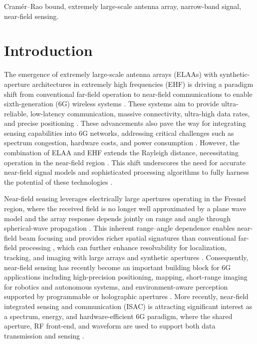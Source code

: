 \documentclass[9pt,final,journal,twocolumn]{IEEEtran}
\begin{document}
\begin{IEEEkeywords}
Cramér–Rao bound, extremely large-scale antenna array,  narrow-band signal, near-field sensing. 
\end{IEEEkeywords}

\IEEEpeerreviewmaketitle

\section{Introduction}
The emergence of extremely large-scale antenna arrays (ELAAs) with synthetic-aperture architectures in extremely high frequencies (EHF) is driving a paradigm shift from conventional far-field operation to near-field communications to enable sixth-generation (6G) wireless systems \cite{elbir2024terahertz,elbir2024curse,hodge2020intelligent}. 
These systems aim to provide ultra-reliable, low-latency communication, massive connectivity, ultra-high data rates, and precise positioning \cite{wachowiak2026sizing,wang2023on}. These advancements also pave the way for integrating sensing capabilities into 6G networks, addressing critical challenges such as spectrum congestion, hardware costs, and power consumption \cite{mishra2024signal,mishra2019toward,wei2024RIS,vargas2023dual}. However, the combination of ELAA and EHF extends the Rayleigh distance, necessitating operation in the near-field region \cite{balanis2011modern,zohair2021near,bevilacqua2025reflectivity,rajwan2025near,jiang2024near}. This shift underscores the need for accurate near-field signal models and sophisticated processing algorithms to fully harness the potential of these technologies \cite{elbir2025near}.
 
Near-field sensing leverages electrically large apertures operating in the Fresnel region, where the received field is no longer well approximated by a plane wave model and the array response depends jointly on range and angle through spherical-wave propagation \cite{elbir2025near}. This inherent range–angle dependence enables near-field beam focusing and provides richer spatial signatures than conventional far-field processing \cite{wei2025wideband,wei2025crb}, which can further enhance resolvability for localization, tracking, and imaging with large arrays and synthetic apertures \cite{wu2021modified,jiang2024near,he2025grating,eamaz2023near,guerra2021near}. Consequently, near-field sensing has recently become an important building block for 6G applications including high-precision positioning, mapping, short-range imaging for robotics and autonomous systems, and environment-aware perception supported by programmable or holographic apertures \cite{zohair2021near,bevilacqua2025reflectivity,rajwan2025near,jiang2024near,wang2025perofrmance}. More recently, near-field integrated sensing and communication (ISAC) is attracting significant interest as a spectrum, energy, and hardware-efficient 6G paradigm, where the shared aperture, RF front-end, and waveform are used to support both data transmission and sensing \cite{wang2023near,zhao2024modeling}.
\end{document}
